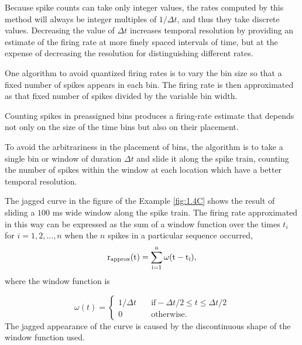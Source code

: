 \begin{lem}
   Because spike counts can take only integer values, the rates computed by this method will 
   always 
  be integer multiples of $1 / \Delta t$, and thus they take discrete values. Decreasing 
  the value of $\Delta t$
increases temporal resolution by providing an estimate of the firing rate at
more finely spaced intervals of time, but at the expense of decreasing the
resolution for distinguishing different rates.
\end{lem}

\begin{alg}
  One algorithm to avoid quantized
firing rates is to vary the bin size so that a fixed number of spikes appears
in each bin. The firing rate is then approximated as that fixed number of
spikes divided by the variable bin width.
\end{alg}

\begin{rem}
  Counting spikes in preassigned bins produces a firing-rate estimate that
depends not only on the size of the time bins but also on their placement.
\end{rem}

\begin{alg}
To avoid the arbitrariness in the placement of bins, the algorithm is to take
a single bin or window of duration $\Delta t$ and slide it along the spike train,
counting the number of spikes within the window at each location which have a better 
temporal resolution.
\end{alg}

\begin{exm}
  \label{fig:1.4C}
  The jagged curve in the figure of the Example \ref{fig:1.4C} shows the result of sliding a $100$ ms wide
window along the spike train.  The firing rate approximated in 
this way
can be expressed as the sum of a window function over the times $t_i$ for
$i = 1 , 2 ,\dots, n$ when the $n$ spikes in a particular sequence occurred,
\begin{equation}
  \label{equ:1.8}
  \rm{r}_{\text{approx}}(t)=\sum_{i = 1}^{n}\omega(t-t_i), 
\end{equation}
where the window function is

\begin{equation}
  \label{equ:1.9}
  \omega(t)=\left\{
    \begin{aligned}
      1/\Delta t \quad &\text{if} -\Delta t/2\leq t\leq \Delta t/2\\
      0 \quad & \text{otherwise}.
    \end{aligned}
  \right.
\end{equation}
The jagged appearance of the curve is caused 
by the discontinuous shape of the window function used.
\end{exm}

